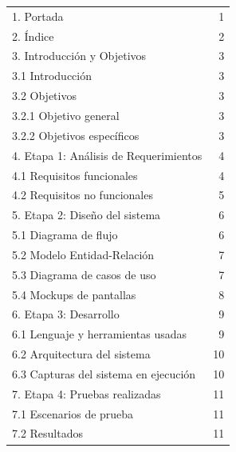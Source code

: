 \documentclass[12pt,a4paper]{article}
\begin{document}
	\begin{tabular}{p{12cm} r}
	1. Portada & 1 \\
	2. Índice & 2 \\[0.2cm]
	3. Introducción y Objetivos & 3 \\[0.2cm]
	\hspace*{0.5cm}3.1 Introducción & 3 \\[0.2cm]
	\hspace*{0.5cm}3.2 Objetivos & 3 \\[0.2cm]
	\hspace*{1cm}3.2.1 Objetivo general & 3 \\[0.2cm]
	\hspace*{1cm}3.2.2 Objetivos específicos & 3 \\[0.2cm]
	4. Etapa 1: Análisis de Requerimientos & 4 \\[0.2cm]
	\hspace*{1cm}4.1 Requisitos funcionales & 4 \\[0.2cm]
	\hspace*{1cm}4.2 Requisitos no funcionales & 5 \\[0.2cm]
	5. Etapa 2: Diseño del sistema & 6 \\[0.2cm]
	\hspace*{1cm}5.1 Diagrama de flujo & 6 \\[0.2cm]
	\hspace*{1cm}5.2 Modelo Entidad-Relación & 7 \\[0.2cm]
	\hspace*{1cm}5.3 Diagrama de casos de uso & 7 \\[0.2cm]
	\hspace*{1cm}5.4 Mockups de pantallas & 8 \\[0.2cm]
	6. Etapa 3: Desarrollo & 9 \\[0.2cm]
	\hspace*{1cm}6.1 Lenguaje y herramientas usadas & 9 \\[0.2cm]
	\hspace*{1cm}6.2 Arquitectura del sistema & 10 \\[0.2cm]
	\hspace*{1cm}6.3 Capturas del sistema en ejecución & 10 \\[0.2cm]
	7. Etapa 4: Pruebas realizadas & 11 \\[0.2cm]
	\hspace*{0.5cm}7.1 Escenarios de prueba & 11 \\[0.2cm]
	\hspace*{0.5cm}7.2 Resultados & 11 \\[0.2cm]

\end{tabular}
\end{document}
